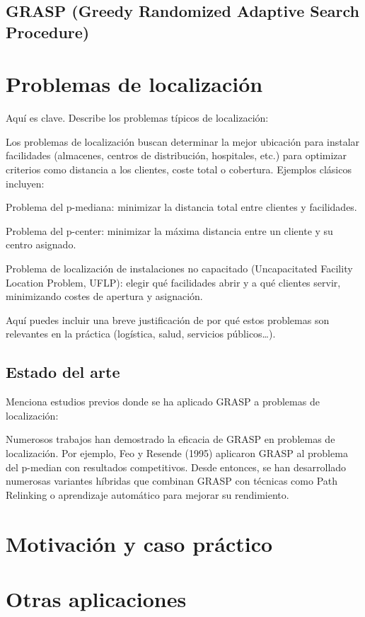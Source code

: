 \documentclass[12pt,a4paper]{book}
\begin{document}
\subsection{GRASP (Greedy Randomized Adaptive Search Procedure)}

\section{Problemas de localización}
Aquí es clave. Describe los problemas típicos de localización:

Los problemas de localización buscan determinar la mejor ubicación para instalar facilidades (almacenes, centros de distribución, hospitales, etc.) para optimizar criterios como distancia a los clientes, coste total o cobertura. Ejemplos clásicos incluyen:

Problema del p-mediana: minimizar la distancia total entre clientes y facilidades.

Problema del p-center: minimizar la máxima distancia entre un cliente y su centro asignado.

Problema de localización de instalaciones no capacitado (Uncapacitated Facility Location Problem, UFLP): elegir qué facilidades abrir y a qué clientes servir, minimizando costes de apertura y asignación.

Aquí puedes incluir una breve justificación de por qué estos problemas son relevantes en la práctica (logística, salud, servicios públicos…).

\subsection{Estado del arte}

Menciona estudios previos donde se ha aplicado GRASP a problemas de localización:

Numerosos trabajos han demostrado la eficacia de GRASP en problemas de localización. 
Por ejemplo, Feo y Resende (1995) aplicaron GRASP al problema del p-median con resultados competitivos. 
Desde entonces, se han desarrollado numerosas variantes híbridas que combinan GRASP con técnicas como Path Relinking o aprendizaje automático para mejorar su rendimiento.


\section{Motivación y caso práctico}

\section{Otras aplicaciones}
\end{document}
